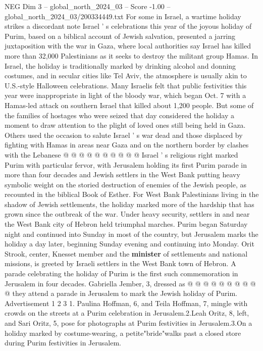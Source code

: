 \begin{textsample}{NEG Dim 3 – global\_north\_2024\_03 – Score -1.00 – global\_north\_2024\_03/200334449.txt}  \label{ex:f3_neg_186}
For some in Israel, a wartime holiday strikes a discordant note Israel ' s celebrations this year of the joyous holiday of Purim, based on a biblical account of Jewish salvation, presented a jarring juxtaposition with the war in Gaza, where local authorities say Israel has killed more than 32,000 Palestinians as it seeks to destroy the militant group Hamas.
In Israel, the holiday is traditionally marked by drinking alcohol and donning costumes, and in secular cities like Tel Aviv, the atmosphere is usually akin to U.S.-style Halloween celebrations.
Many Israelis felt that public festivities this year were inappropriate in light of the bloody war, which began Oct. 7 with a Hamas-led attack on southern Israel that killed about 1,200 people.
But some of the families of hostages who were seized that day considered the holiday a moment to draw attention to the plight of loved ones still being held in Gaza.
Others used the occasion to salute Israel ' s war dead and those displaced by fighting with Hamas in areas near Gaza and on the northern border by clashes with the Lebanese @ @ @ @ @ @ @ @ @ @ Israel ' s religious right marked Purim with particular fervor, with Jerusalem holding its first Purim parade in more than four decades and Jewish settlers in the West Bank putting heavy symbolic weight on the storied destruction of enemies of the Jewish people, as recounted in the biblical Book of Esther.
For West Bank Palestinians living in the shadow of Jewish settlements, the holiday marked more of the hardship that has grown since the outbreak of the war.
Under heavy security, settlers in and near the West Bank city of Hebron held triumphal marches.
Purim began Saturday night and continued into Sunday in most of the country, but Jerusalem marks the holiday a day later, beginning Sunday evening and continuing into Monday.
Orit Strook, center, Knesset member and the \textbf{minister} of settlements and national missions, is greeted by Israeli settlers in the West Bank town of Hebron.
A parade celebrating the holiday of Purim is the first such commemoration in Jerusalem in four decades.
Gabriella Jember, 3, dressed as @ @ @ @ @ @ @ @ @ @ they attend a parade in Jerusalem to mark the Jewish holiday of Purim.
Advertisement 1 2 3 1.
Paulina Hoffman, 6, and Teila Hoffman, 7, mingle with crowds on the streets at a Purim celebration in Jerusalem.2.Leah Oritz, 8, left, and Sari Oritz, 5, pose for photographs at Purim festivities in Jerusalem.3.On a holiday marked by costume-wearing, a petite"bride"walks past a closed store during Purim festivities in Jerusalem.

\end{textsample}
